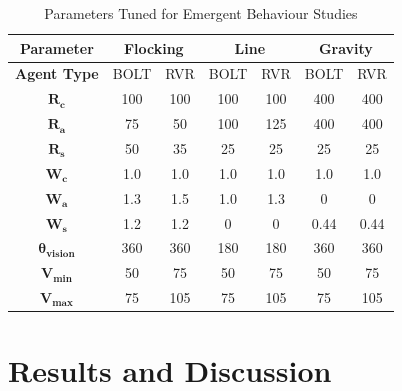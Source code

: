 \documentclass[conference]{IEEEtran}
\begin{document}
\begin{table}[h]
\centering
\caption{Parameters Tuned for Emergent Behaviour Studies}
\label{tab1}
\begin{tabular}{|c|c|c|c|c|c|c|}
\hline
\textbf{Parameter}     & \multicolumn{2}{|c|}{\textbf{Flocking}} & \multicolumn{2}{|c|}{\textbf{Line}} & \multicolumn{2}{|c|}{\textbf{Gravity}} \\  \hline
\textbf{Agent Type}    & BOLT               & RVR              & BOLT             & RVR            & BOLT              & RVR              \\ \hline
$\mathbf{R_c}$         & 100                & 100              & 100              & 100            & 400               & 400              \\ \hline
$\mathbf{R_a}$         & 75                 & 50               & 100              & 125            & 400               & 400              \\ \hline
$\mathbf{R_s}$         & 50                 & 35               & 25               & 25             & 25                & 25               \\ \hline
$\mathbf{W_c}$         & 1.0                & 1.0              & 1.0              & 1.0            & 1.0               & 1.0              \\ \hline
$\mathbf{W_a}$         & 1.3                & 1.5              & 1.0              & 1.3            & 0                 & 0                \\ \hline
$\mathbf{W_s}$         & 1.2                & 1.2              & 0                & 0              & 0.44              & 0.44             \\ \hline
$\mathbf{\theta_{vision}}$ & 360            & 360              & 180              & 180            & 360               & 360              \\ \hline
$\mathbf{V_{min}}$     & 50                 & 75               & 50               & 75             & 50                & 75               \\ \hline
$\mathbf{V_{max}}$     & 75                 & 105              & 75               & 105            & 75                & 105 \\ \hline             
\end{tabular}
\end{table}

\FloatBarrier
\section{Results and Discussion}
\end{document}
